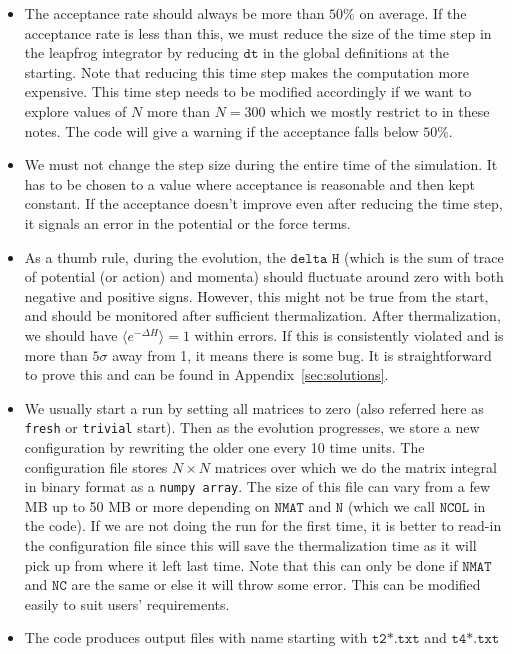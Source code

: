 \documentclass[letter,11pt]{article}
\begin{document}
\begin{itemize} 
\item The acceptance rate should always be more than $50\%$
on average. If the acceptance rate is less than this, we
must reduce the size of the time step in the leapfrog integrator by reducing 
$\texttt{dt}$ in the global definitions at the starting. Note that 
reducing this time step makes the computation more expensive. 
This time step needs to be modified accordingly if we want to explore values of $N$
more than $N = 300$ which we mostly restrict to in these notes. The code will give a warning
if the acceptance falls below $50\%$.  
\item We must not change the step size during the entire time of the simulation. It has to be 
chosen to a value where acceptance is reasonable and then kept constant. If the acceptance
doesn't improve even after reducing the time step, it signals an error in the potential or the force terms.
\item As a thumb rule, during the evolution, the $\texttt{delta H}$ (which is the sum of
trace of potential (or action) and momenta) should fluctuate around zero
with both negative and positive signs. However, this might not be true from the start, and should
be monitored after sufficient thermalization. After thermalization, we should have 
$\langle e^{-\Delta H} \rangle = 1$ within errors. If this is consistently violated and is more than $5\sigma$ away from 1, it means there is some bug. It is straightforward to prove this and can be found in Appendix~\ref{sec:solutions}.
\item We usually start a run by setting all matrices to zero (also referred here as \texttt{fresh} or 
\texttt{trivial} start). Then as the evolution progresses, we store a new configuration by rewriting the older one every 10 time units. The configuration file stores $N \times N$ matrices over which we do the matrix integral 
in binary format as a \texttt{numpy array}. 
The size of this file can vary from a few MB up to 50 MB or more depending on 
$\texttt{NMAT}$ and $\texttt{N}$ (which we call $\texttt{NCOL}$ in the code). If we are not doing the run for the first time, it is better to read-in the configuration file since this will save the thermalization time as it will pick up from where it left last time.  
Note that this can only be done if $\texttt{NMAT}$ and $\texttt{NC}$ are the same or else
it will throw some error. This can be modified easily to suit users' requirements. 
\item The code produces output files with name starting with $\texttt{t2*.txt}$ and $\texttt{t4*.txt}$

\end{itemize}
\end{document}
